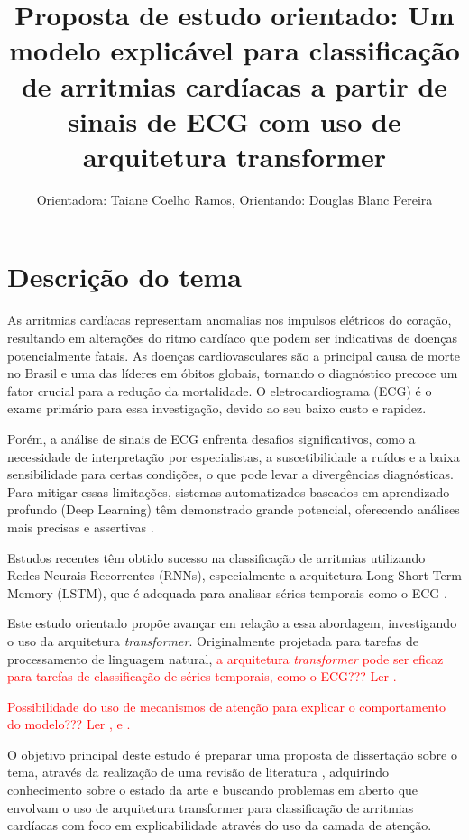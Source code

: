 \documentclass[12pt]{article}
\title{Proposta de estudo orientado: Um modelo explicável para classificação de arritmias cardíacas a partir de sinais de ECG com uso de arquitetura transformer}
\author{Orientadora: Taiane Coelho Ramos\inst{1}, Orientando: Douglas Blanc Pereira\inst{1}}
\begin{document}
 

\maketitle

\section{Descrição do tema}

As arritmias cardíacas representam anomalias nos impulsos elétricos do coração, resultando em alterações do ritmo cardíaco que podem ser indicativas de doenças potencialmente fatais. As doenças cardiovasculares são a principal causa de morte no Brasil e uma das líderes em óbitos globais, tornando o diagnóstico precoce um fator crucial para a redução da mortalidade. O eletrocardiograma (ECG) é o exame primário para essa investigação, devido ao seu baixo custo e rapidez\cite{zirpolo2025modelo,da2024arritmias}.

Porém, a análise de sinais de ECG enfrenta desafios significativos, como a necessidade de interpretação por especialistas, a suscetibilidade a ruídos e a baixa sensibilidade para certas condições, o que pode levar a divergências diagnósticas. Para mitigar essas limitações, sistemas automatizados baseados em aprendizado profundo (Deep Learning) têm demonstrado grande potencial, oferecendo análises mais precisas e assertivas \cite{ansari2023deep}.

Estudos recentes têm obtido sucesso na classificação de arritmias utilizando Redes Neurais Recorrentes (RNNs), especialmente a arquitetura Long Short-Term Memory (LSTM), que é adequada para analisar séries temporais como o ECG \cite{zirpolo2025modelo}.

Este estudo orientado propõe avançar em relação a essa abordagem, investigando o uso da arquitetura \textit{transformer}. Originalmente projetada para tarefas de processamento de linguagem natural, \textcolor{red}{a arquitetura \textit{transformer} pode ser eficaz para tarefas de classificação de séries temporais, como o ECG??? Ler \cite{vaswani2017attention}.}

\textcolor{red}{Possibilidade do uso de mecanismos de atenção para explicar o comportamento do modelo??? Ler \cite{jain2019attention}, \cite{lundberg2017unified} e \cite{wiegreffe2019attention}.}

O objetivo principal deste estudo é preparar uma proposta de dissertação sobre o tema, através da realização de uma revisão de literatura \cite{kitchenham2004procedures}, adquirindo conhecimento sobre o estado da arte e buscando problemas em aberto que envolvam o uso de arquitetura transformer para classificação de arritmias cardíacas com foco em explicabilidade através do uso da camada de atenção.
\end{document}
